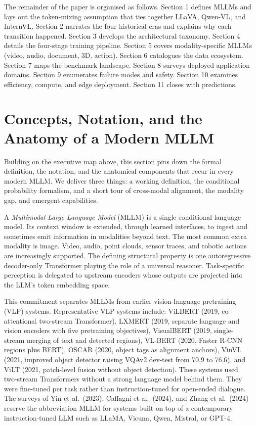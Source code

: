 The remainder of the paper is organised as follows. Section 1 defines MLLMs and lays out the token-mixing assumption that ties together LLaVA, Qwen-VL, and InternVL. Section 2 narrates the four historical eras and explains why each transition happened. Section 3 develops the architectural taxonomy. Section 4 details the four-stage training pipeline. Section 5 covers modality-specific MLLMs (video, audio, document, 3D, action). Section 6 catalogues the data ecosystem. Section 7 maps the benchmark landscape. Section 8 surveys deployed application domains. Section 9 enumerates failure modes and safety. Section 10 examines efficiency, compute, and edge deployment. Section 11 closes with predictions.

\section{Concepts, Notation, and the Anatomy of a Modern MLLM}\label{concepts-notation-and-the-anatomy-of-a-modern-mllm}

Building on the executive map above, this section pins down the formal definition, the notation, and the anatomical components that recur in every modern MLLM. We deliver three things: a working definition, the conditional probability formalism, and a short tour of cross-modal alignment, the modality gap, and emergent capabilities.

A \emph{Multimodal Large Language Model} (MLLM) is a single conditional language model. Its context window is extended, through learned interfaces, to ingest and sometimes emit information in modalities beyond text. The most common extra modality is image. Video, audio, point clouds, sensor traces, and robotic actions are increasingly supported. The defining structural property is one autoregressive decoder-only Transformer playing the role of a universal reasoner. Task-specific perception is delegated to upstream encoders whose outputs are projected into the LLM's token embedding space.

This commitment separates MLLMs from earlier vision-language pretraining (VLP) systems. Representative VLP systems include: ViLBERT (2019, co-attentional two-stream Transformer), LXMERT (2019, separate language and vision encoders with five pretraining objectives), VisualBERT (2019, single-stream merging of text and detected regions), VL-BERT (2020, Faster R-CNN regions plus BERT), OSCAR (2020, object tags as alignment anchors), VinVL (2021, improved object detector raising VQAv2 dev-test from 70.9 to 76.6), and ViLT (2021, patch-level fusion without object detection). These systems used two-stream Transformers without a strong language model behind them. They were fine-tuned per task rather than instruction-tuned for open-ended dialogue. The surveys of Yin et al.~(2023), Caffagni et al.~(2024), and Zhang et al.~(2024) reserve the abbreviation MLLM for systems built on top of a contemporary instruction-tuned LLM such as LLaMA, Vicuna, Qwen, Mistral, or GPT-4.

